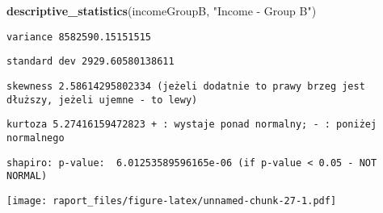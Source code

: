 \documentclass[]{article}
\newenvironment{Shaded}{\begin{snugshade}}{\end{snugshade}}
\newcommand{\KeywordTok}[1]{\textcolor[rgb]{0.13,0.29,0.53}{\textbf{{#1}}}}
\newcommand{\StringTok}[1]{\textcolor[rgb]{0.31,0.60,0.02}{{#1}}}
\newcommand{\NormalTok}[1]{{#1}}
\begin{document}
\begin{Shaded}
\begin{Highlighting}[]
\KeywordTok{descriptive_statistics}\NormalTok{(incomeGroupB, }\StringTok{"Income - Group B"}\NormalTok{)}
\end{Highlighting}
\end{Shaded}

\begin{verbatim}
variance 8582590.15151515
\end{verbatim}

\begin{verbatim}
standard dev 2929.60580138611
\end{verbatim}

\begin{verbatim}
skewness 2.58614295802334 (jeżeli dodatnie to prawy brzeg jest dłuższy, jeżeli ujemne - to lewy)
\end{verbatim}

\begin{verbatim}
kurtoza 5.27416159472823 + : wystaje ponad normalny; - : poniżej normalnego
\end{verbatim}

\begin{verbatim}
shapiro: p-value:  6.01253589596165e-06 (if p-value < 0.05 - NOT NORMAL)
\end{verbatim}

\texttt{[image: raport\_files/figure-latex/unnamed-chunk-27-1.pdf]}
\end{document}
